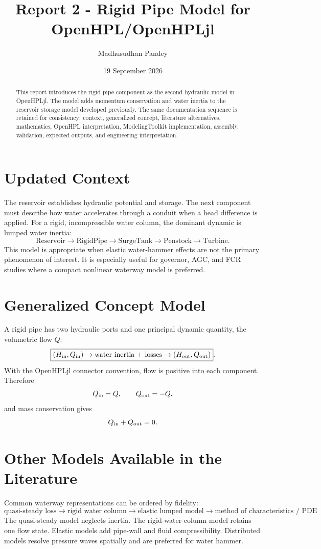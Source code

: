 \documentclass[11pt,a4paper]{article}
\title{Report 2 - Rigid Pipe Model for OpenHPL/OpenHPLjl}
\author{Madhusudhan Pandey}
\date{19 September 2026}
\begin{document}
\maketitle
\begin{abstract}
This report introduces the rigid-pipe component as the second hydraulic model in OpenHPLjl. The model adds momentum conservation and water inertia to the reservoir storage model developed previously. The same documentation sequence is retained for consistency: context, generalized concept, literature alternatives, mathematics, OpenHPL interpretation, ModelingToolkit implementation, assembly, validation, expected outputs, and engineering interpretation.
\end{abstract}

\section{Updated Context}
The reservoir establishes hydraulic potential and storage. The next component must describe how water accelerates through a conduit when a head difference is applied. For a rigid, incompressible water column, the dominant dynamic is lumped water inertia:
\[
\boxed{\text{Reservoir}\rightarrow\text{RigidPipe}\rightarrow\text{SurgeTank}\rightarrow\text{Penstock}\rightarrow\text{Turbine}}.
\]
This model is appropriate when elastic water-hammer effects are not the primary phenomenon of interest. It is especially useful for governor, AGC, and FCR studies where a compact nonlinear waterway model is preferred.

\section{Generalized Concept Model}
A rigid pipe has two hydraulic ports and one principal dynamic quantity, the volumetric flow $Q$:
\[
\boxed{(H_{\rm in},Q_{\rm in})\rightarrow\text{water inertia + losses}\rightarrow(H_{\rm out},Q_{\rm out})}.
\]
With the OpenHPLjl connector convention, flow is positive into each component. Therefore
\[
Q_{\rm in}=Q,\qquad Q_{\rm out}=-Q,
\]
and mass conservation gives
\[
Q_{\rm in}+Q_{\rm out}=0.
\]

\section{Other Models Available in the Literature}
Common waterway representations can be ordered by fidelity:
\[
\boxed{\text{quasi-steady loss}\rightarrow\text{rigid water column}\rightarrow\text{elastic lumped model}\rightarrow\text{method of characteristics / PDE}}.
\]
The quasi-steady model neglects inertia. The rigid-water-column model retains one flow state. Elastic models add pipe-wall and fluid compressibility. Distributed models resolve pressure waves spatially and are preferred for water hammer.
\end{document}
